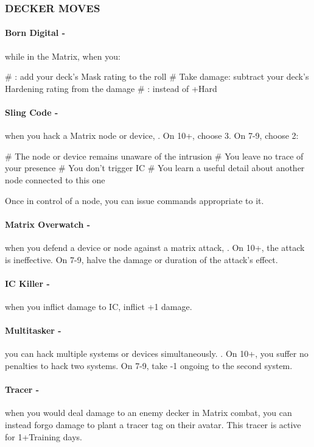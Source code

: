 \subsubsection{DECKER MOVES}
\paragraph{Born Digital -} while in the Matrix, when you:
    \begin{easylist}
        # : add your deck’s Mask rating to the roll
        # Take damage: subtract your deck’s Hardening rating from the damage
        # :  instead of +Hard
    \end{easylist}

\paragraph{Sling Code -} when you hack a Matrix node or device, . On 10+, choose 3. On 7-9, choose 2:
    \begin{easylist}
        # The node or device remains unaware of the intrusion
        # You leave no trace of your presence
        # You don’t trigger IC
        # You learn a useful detail about another node connected to this one
    \end{easylist}
Once in control of a node, you can issue commands appropriate to it.

\paragraph{Matrix Overwatch -} when you defend a device or node against a matrix attack, . On 10+, the attack is ineffective. On 7-9, halve the damage or duration of the attack’s effect.

\paragraph{IC Killer -} when you inflict damage to IC, inflict +1 damage.

\paragraph{Multitasker -} you can hack multiple systems or devices simultaneously. . On 10+, you suffer no penalties to hack two systems. On 7-9, take -1 ongoing to the second system.

\paragraph{Tracer -} when you would deal damage to an enemy decker in Matrix combat, you can instead forgo damage to plant a tracer tag on their avatar. This tracer is active for 1+Training days.



